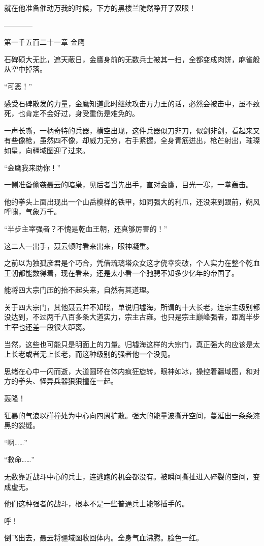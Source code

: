 \begin{this_body}
就在他准备催动万我的时候，下方的黑楼兰陡然睁开了双眼！

------------

第一千五百二十一章 金鹰

石碑硕大无比，遮天蔽日，金鹰身前的无数兵士被其一扫，全都变成肉饼，麻雀般从空中掉落。

“可恶！”

感受石碑散发的力量，金鹰知道此时继续攻击万力王的话，必然会被击中，虽不致死，也肯定不会好过，身受重伤是难免的。

一声长嘶，一柄奇特的兵器，横空出现，这件兵器似刀非刀，似剑非剑，看起来又有些像枪，虽然四不像，却威力无穷，右手紧握，全身青筋迸出，枪芒射出，璀璨如星，向疆域图迎了过来。

“金鹰我来助你！”

一侧准备偷袭聂云的暗枭，见后者当先出手，直对金鹰，目光一寒，一拳轰击。

他的拳头上面出现出一个山岳模样的铁甲，如同强大的利爪，还没来到跟前，朔风呼啸，气象万千。

“半步主宰强者？不愧是乾血王朝，还真够厉害的！”

这二人一出手，聂云顿时看来出来，眼神凝重。

之前以为独孤彦君是个巧合，凭借琉璃塔众女这才侥幸突破，个人实力在整个乾血王朝都能数得着，现在看来，还是太小看一个驰骋不知多少亿年的帝国了。

能将四大宗门压的抬不起头来，自然有其道理。

关于四大宗门，其他聂云并不知晓，单说归墟海，所谓的十大长老，连宗主级别都没达到，不过两千八百多条大道实力，宗主古雍。也只是宗主巅峰强者，距离半步主宰也还差一段很大距离。

当然，这些也可能只是明面上的力量。归墟海这样的大宗门，真正强大的应该是太上长老或者无上长老，而这种级别的强者他一个没见。

思绪在心中一闪而逝，大道圆环在体内疯狂旋转，眼神如冰，操控着疆域图，和对方的拳头、怪异兵器狠狠撞在一起。

轰隆！

狂暴的气浪以碰撞处为中心向四周扩散。强大的能量波撕开空间，蔓延出一条条漆黑的裂缝。

“啊……”

“救命……”

无数靠近战斗中心的兵士，连逃跑的机会都没有。被瞬间撕扯进入碎裂的空间，变成虚无。

他们这种强者的战斗，根本不是一些普通兵士能够插手的。

呼！

倒飞出去，聂云将疆域图收回体内。全身气血沸腾。脸色一红。


\end{this_body}
